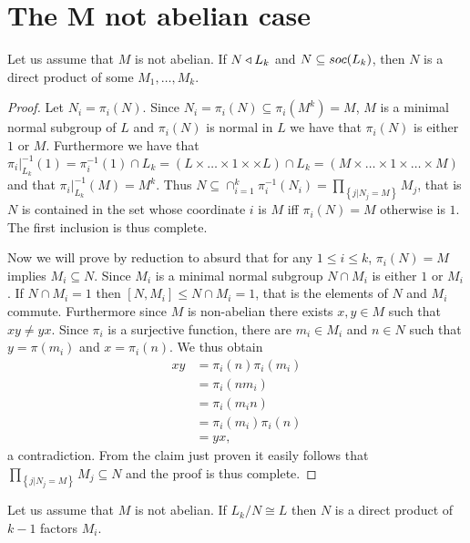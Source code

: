 \section{The M not abelian case}

\begin{theorem}
    \label{S4:Ndp}
    Let us assume that $M$ is not abelian. If $N \triangleleft L_k$ and $N \subseteq soc {(L_k)}$, then $N$ is a direct product of some $M_1,\ldots ,M_k$.
\end{theorem}

\begin{proof}
    Let $N_i = \pi_i(N)$. Since $N_i = \pi_i(N) \subseteq \pi_i(M^k) = M$, $M$ is a minimal normal subgroup of $L$ and $\pi_i(N)$ is normal in $L$ we have that $\pi_i(N)$ is either $1$ or $M$.
    Furthermore we have that $\pi_i|_{L_k}^{-1}(1) = \pi_i^{-1}(1) \cap L_k = (L \times \ldots  \times 1 \times \times L) \cap L_k = (M \times \ldots  \times 1 \times \ldots  \times M)$ and that $\pi_i|_{L_k}^{-1}(M) = M^k$.
    Thus $N \subseteq \cap_{i=1}^k \pi_i^{-1}(N_i) = \prod_{\left\{j | N_j = M \right\}} M_j$, that is $N$ is contained in the set whose coordinate $i$ is $M$ iff $\pi_i(N) = M$ otherwise is $1$. The first inclusion is thus complete.

    Now we will prove by reduction to absurd that for any $1 \le i \le k$, $\pi_i(N) = M$ implies $M_i \subseteq N$. Since $M_i$ is a minimal normal subgroup $N \cap M_i$ is either $1$ or $M_i$. If $N \cap M_i = 1$ then $[N, M_i] \le N \cap M_i = 1$, that is the elements of $N$ and $M_i$ commute. Furthermore since $M$ is non-abelian there exists $x,y \in M$ such that $xy \ne yx$. Since $\pi_i$ is a surjective function, there are $m_i \in M_i$ and $n \in N$ such that $y= \pi(m_i)$ and $x = \pi_i(n)$. We thus obtain 
    \begin{align*}
        xy &= \pi_i(n)\pi_i(m_i) \\ 
           &= \pi_i(nm_i) \\
           &= \pi_i(m_in) \\
           &= \pi_i(m_i)\pi_i(n) \\
           &=yx,
    \end{align*}
    a contradiction.
    From the claim just proven it easily follows that $\prod_{\left\{j | N_j = M \right\}} M_j \subseteq N$ and the proof is thus complete.

\end{proof}

\begin{theorem}
    \label{S4:Ndpkm1}
    Let us assume that $M$ is not abelian. If $L_k/N \cong L$ then $N$ is a direct product of $k-1$ factors $M_i$.
\end{theorem}


